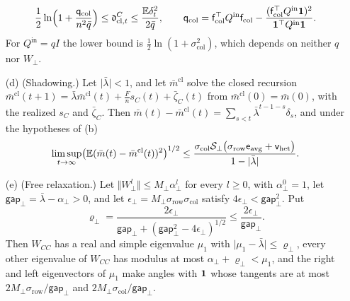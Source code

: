 \begin{theorem}
\begin{enumerate}
\begin{equation}\label{eq:apx-level0-closure}
\frac12\ln\Bigl(1+\frac{\mathsf q_{\mathrm{col}}}{n^2\bar q}\Bigr)\le\mathfrak d^C_{\mathrm{cl},t}\le\frac{\E\delta_t^2}{2\bar q},\qquad\mathsf q_{\mathrm{col}}=\mathsf f_{\mathrm{col}}^\top Q^{\mathrm{in}}\mathsf f_{\mathrm{col}}-\frac{(\mathsf f_{\mathrm{col}}^\top Q^{\mathrm{in}}\one)^2}{\one^\top Q^{\mathrm{in}}\one}.
\end{equation}
For $Q^{\mathrm{in}}=qI$ the lower bound is $\frac12\ln(1+\sigma_{\mathrm{col}}^2)$, which depends on neither $q$ nor $W_\perp$.
\item[(d)] (Shadowing.) Let $\lvert\bar\lambda\rvert<1$, and let $\bar m^{\mathrm{cl}}$ solve the closed recursion $\bar m^{\mathrm{cl}}(t+1)=\bar\lambda\bar m^{\mathrm{cl}}(t)+\frac Fns_C(t)+\bar\zeta_C(t)$ from $\bar m^{\mathrm{cl}}(0)=\bar m(0)$, with the realized $s_C$ and $\bar\zeta_C$. Then $\bar m(t)-\bar m^{\mathrm{cl}}(t)=\sum_{s<t}\bar\lambda^{t-1-s}\delta_s$, and under the hypotheses of (b)
\begin{equation}\label{eq:apx-level0-shadow}
\limsup_{t\to\infty}\bigl(\mathbb{E}(\bar m(t)-\bar m^{\mathrm{cl}}(t))^2\bigr)^{1/2}\le\frac{\sigma_{\mathrm{col}}\mathcal S_\perp\bigl(\sigma_{\mathrm{row}}\mathsf e_{\mathrm{avg}}+\mathsf v_{\mathrm{het}}\bigr)}{1-\lvert\bar\lambda\rvert}.
\end{equation}
\item[(e)] (Free relaxation.) Let $\Vert W_\perp^l\Vert\le M_\perp\alpha_\perp^l$ for every $l\ge0$, with $\alpha_\perp^0=1$, let $\mathsf{gap}_\perp=\bar\lambda-\alpha_\perp>0$, and let $\epsilon_\perp=M_\perp\sigma_{\mathrm{row}}\sigma_{\mathrm{col}}$ satisfy $4\epsilon_\perp<\mathsf{gap}_\perp^2$. Put
\begin{equation*}
\varrho_\perp=\frac{2\epsilon_\perp}{\mathsf{gap}_\perp+(\mathsf{gap}_\perp^2-4\epsilon_\perp)^{1/2}}\le\frac{2\epsilon_\perp}{\mathsf{gap}_\perp}.
\end{equation*}
Then $W_{CC}$ has a real and simple eigenvalue $\mu_1$ with $\lvert\mu_1-\bar\lambda\rvert\le\varrho_\perp$, every other eigenvalue of $W_{CC}$ has modulus at most $\alpha_\perp+\varrho_\perp<\mu_1$, and the right and left eigenvectors of $\mu_1$ make angles with $\mathbf{1}$ whose tangents are at most $2M_\perp\sigma_{\mathrm{row}}/\mathsf{gap}_\perp$ and $2M_\perp\sigma_{\mathrm{col}}/\mathsf{gap}_\perp$.
\end{enumerate}
\end{theorem}

